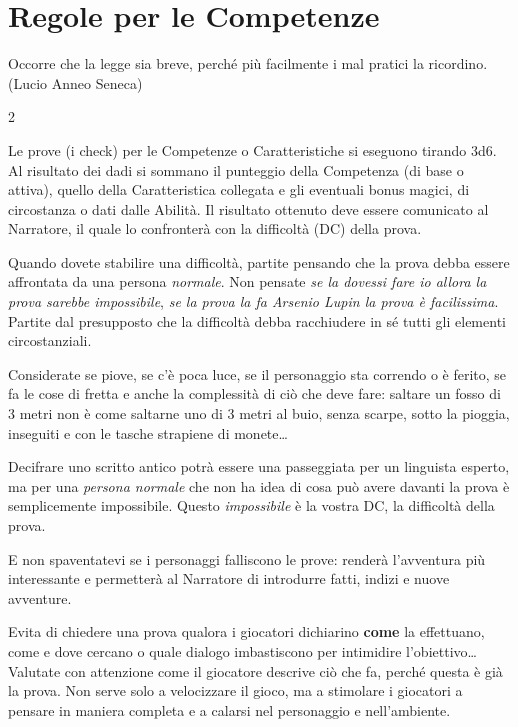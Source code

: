 \section{Regole per le Competenze}

\begin{enfasi}{
Occorre che la legge sia breve, perché più facilmente i mal pratici la ricordino. (Lucio Anneo Seneca)}\end{enfasi}

\begin{multicols}{2}

Le prove (i check) per le Competenze o Caratteristiche si eseguono tirando 3d6. Al risultato dei dadi si sommano il punteggio della Competenza (di base o attiva), quello della Caratteristica collegata e gli eventuali bonus magici, di circostanza o dati dalle Abilità. Il risultato ottenuto deve essere comunicato al Narratore, il quale lo confronterà con la difficoltà (DC) della prova.

Quando dovete stabilire una difficoltà, partite pensando che la prova debba essere affrontata da una persona \emph{normale}. Non pensate \emph{se la dovessi fare io allora la prova sarebbe impossibile}, \emph{se la prova la fa Arsenio Lupin la prova è facilissima}. Partite dal presupposto che la difficoltà debba racchiudere in sé tutti gli elementi circostanziali.

Considerate se piove, se c'è poca luce, se il personaggio sta correndo o è ferito, se fa le cose di fretta e anche la complessità di ciò che deve fare: saltare un fosso di 3 metri non è come saltarne uno di 3 metri al buio, senza scarpe, sotto la pioggia, inseguiti e con le tasche strapiene di monete…

Decifrare uno scritto antico potrà essere una passeggiata per un linguista esperto, ma per una \emph{persona normale} che non ha idea di cosa può avere davanti la prova è semplicemente impossibile. Questo \emph{impossibile} è la vostra DC, la difficoltà della prova.

E non spaventatevi se i personaggi falliscono le prove: renderà l'avventura più interessante e permetterà al Narratore di introdurre fatti, indizi e nuove avventure.

\begin{narratore}
Evita di chiedere una prova qualora i giocatori dichiarino \textbf{come} la effettuano, come e dove cercano o quale dialogo imbastiscono per intimidire l'obiettivo… Valutate con attenzione come il giocatore descrive ciò che fa, perché questa è già la prova. Non serve solo a velocizzare il gioco, ma a stimolare i giocatori a pensare in maniera completa e a calarsi nel personaggio e nell'ambiente.


\end{narratore}
\end{multicols}
